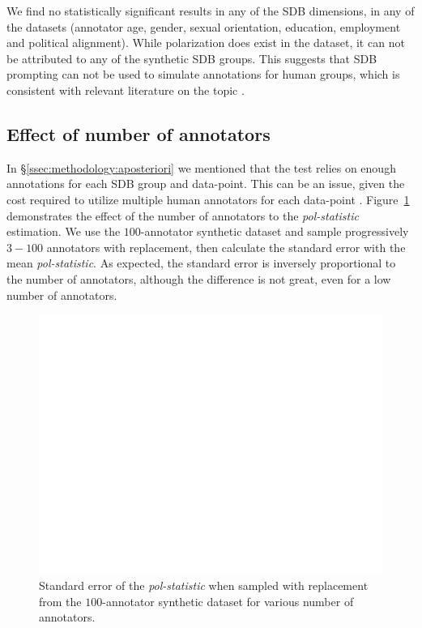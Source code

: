 \documentclass{article}
\begin{document}
We find no statistically significant results in any of the \ac{SDB} dimensions, in any of the datasets (annotator age, gender, sexual orientation, education, employment and political alignment). While polarization does exist in the dataset, %
it can not be attributed to any of the synthetic \ac{SDB} groups. This suggests that \ac{SDB} prompting can not be used to simulate annotations for human groups, which is consistent with relevant literature on the topic \parencite{anthis_2025,hewitt2024predicting,rossi_2024,jansen_2023,bisbee_2023,neumann_2025}.


\subsection{Effect of number of annotators}
\label{ssec: results:num_annotators}

In \S\ref{ssec:methodology:aposteriori} we mentioned that the test relies on enough annotations for each \ac{SDB} group and data-point. This can be an issue, given the cost required to utilize multiple human annotators for each data-point \parencite{rossi_2024}. Figure~\ref{fig::std_error} demonstrates the effect of the number of annotators to the \textit{pol-statistic} estimation. We use the $100$-annotator synthetic dataset and sample progressively $3-100$ annotators with replacement, then calculate the standard error with the mean \textit{pol-statistic}. As expected, the standard error is inversely proportional to the number of annotators, although the difference is not great, even for a low number of annotators.

\begin{figure}
	\includegraphics[width=\linewidth]{ndfu_std_error_sample_size.png}
	\caption{Standard error of the \textit{pol-statistic} when sampled with replacement from the $100$-annotator synthetic dataset for various number of annotators.}
	\label{fig::std_error}
\end{figure}
\end{document}
